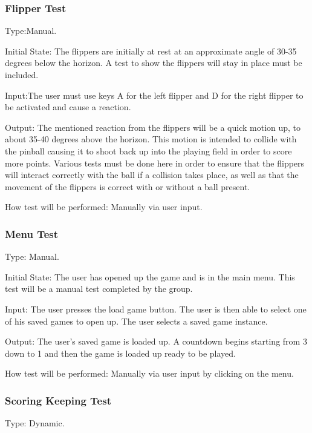 \documentclass[12pt, titlepage]{article}
\begin{document}
\subsubsection{Flipper Test}


Type:Manual.
					
Initial State: The flippers are initially at rest at an approximate angle of 30-35 degrees below the horizon. A test to show the flippers will stay in place must be included.
				
Input:The user must use keys A for the left flipper and D for the right flipper to be activated and cause a reaction.

Output: The mentioned reaction from the flippers will be a quick motion up, to about 35-40 degrees above the horizon. This motion is intended to collide with the pinball causing it to shoot back up into the playing field in order to score more points. Various tests must be done here in order to ensure that the flippers will interact correctly with the ball if a collision takes place, as well as that the movement of the flippers is correct with or without a ball present.
					
How test will be performed: Manually via user input.\\

\subsubsection{Menu Test}


Type: Manual.
					
Initial State: The user has opened up the game and is in the main menu. This test will be a manual test completed by the group.
				
Input: The user presses the load game button. The user is then able to select one of his saved games to open up. The user selects a saved game instance.

Output: The user's saved game is loaded up. A countdown begins starting from 3 down to 1 and then the game is loaded up ready to be played.
					
How test will be performed: Manually via user input by clicking on the menu.\\

\subsubsection{Scoring Keeping Test}


Type: Dynamic.
					
\end{document}
